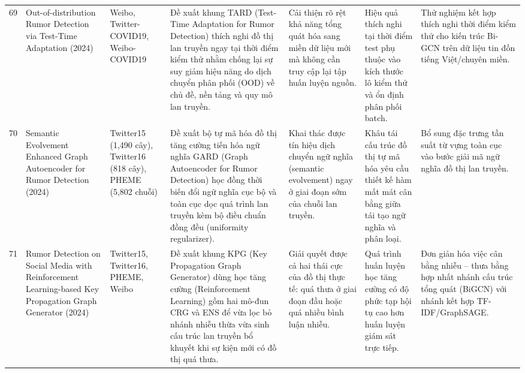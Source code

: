 \documentclass[11pt,a4paper]{extreport}
\begin{document}
\begin{landscape}
\begin{longtable}{@{}C{0.6cm}p{3.6cm}p{2.7cm}p{4.8cm}p{3.6cm}p{3.6cm}p{3.6cm}@{}}
69 & Out-of-distribution Rumor Detection via Test-Time Adaptation (2024) \cite{tao_out--distribution_2024} & Weibo, Twitter-COVID19, Weibo-COVID19 & Đề xuất khung TARD (Test-Time Adaptation for Rumor Detection) thích nghi đồ thị lan truyền ngay tại thời điểm kiểm thử nhằm chống lại sự suy giảm hiệu năng do dịch chuyển phân phối (OOD) về chủ đề, nền tảng và quy mô lan truyền. & Cải thiện rõ rệt khả năng tổng quát hóa sang miền dữ liệu mới mà không cần truy cập lại tập huấn luyện nguồn. & Hiệu quả thích nghi tại thời điểm test phụ thuộc vào kích thước lô kiểm thử và ổn định phân phối batch. & Thử nghiệm kết hợp thích nghi thời điểm kiểm thử cho kiến trúc Bi-GCN trên dữ liệu tin đồn tiếng Việt/chuyên miền. \\ 

70 & Semantic Evolvement Enhanced Graph Autoencoder for Rumor Detection (2024) \cite{tao_semantic_2024} & Twitter15 (1,490 cây), Twitter16 (818 cây), PHEME (5,802 chuỗi) & Đề xuất bộ tự mã hóa đồ thị tăng cường tiến hóa ngữ nghĩa GARD (Graph Autoencoder for Rumor Detection) học đồng thời biến đổi ngữ nghĩa cục bộ và toàn cục dọc quá trình lan truyền kèm bộ điều chuẩn đồng đều (uniformity regularizer). & Khai thác được tín hiệu dịch chuyển ngữ nghĩa (semantic evolvement) ngay ở giai đoạn sớm của chuỗi lan truyền. & Khâu tái cấu trúc đồ thị tự mã hóa yêu cầu thiết kế hàm mất mát cân bằng giữa tái tạo ngữ nghĩa và phân loại. & Bổ sung đặc trưng tần suất từ vựng toàn cục vào bước giải mã ngữ nghĩa đồ thị lan truyền. \\ 

71 & Rumor Detection on Social Media with Reinforcement Learning-based Key Propagation Graph Generator (2024) \cite{zhang_rumor_2024} & Twitter15, Twitter16, PHEME, Weibo & Đề xuất khung KPG (Key Propagation Graph Generator) dùng học tăng cường (Reinforcement Learning) gồm hai mô-đun CRG và ENS để vừa lọc bỏ nhánh nhiễu thừa vừa sinh cấu trúc lan truyền bổ khuyết khi sự kiện mới có đồ thị quá thưa. & Giải quyết được cả hai thái cực của đồ thị thực tế: quá thưa ở giai đoạn đầu hoặc quá nhiều bình luận nhiễu. & Quá trình huấn luyện học tăng cường có độ phức tạp hội tụ cao hơn huấn luyện giám sát trực tiếp. & Đơn giản hóa việc cân bằng nhiễu -- thưa bằng hợp nhất nhánh cấu trúc tổng quát (BiGCN) với nhánh kết hợp TF-IDF/GraphSAGE. \\ 


\end{longtable}
\end{landscape}
\end{document}
